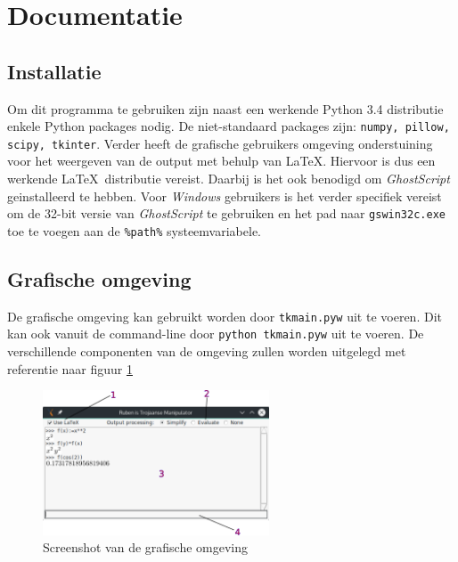 \documentclass[a4paper]{article}
\begin{document}
\section{Documentatie}
\subsection{Installatie}
Om dit programma te gebruiken zijn naast een werkende Python 3.4 distributie enkele Python packages nodig. De niet-standaard packages zijn: \texttt{numpy, pillow, scipy, tkinter}.
Verder heeft de grafische gebruikers omgeving onderstuining voor het weergeven van de output met behulp van \LaTeX. Hiervoor is dus een werkende \LaTeX~distributie vereist. Daarbij is het ook benodigd om \emph{GhostScript} geinstalleerd te hebben. Voor \emph{Windows} gebruikers is het verder specifiek vereist om de 32-bit versie van \emph{GhostScript} te gebruiken en het pad naar \texttt{gswin32c.exe} toe te voegen aan de \texttt{\%path\%} systeemvariabele.

\subsection{Grafische omgeving}
De grafische omgeving kan gebruikt worden door \texttt{tkmain.pyw} uit te voeren. Dit kan ook vanuit de command-line door \texttt{python tkmain.pyw} uit te voeren.  De verschillende componenten van de omgeving zullen worden uitgelegd met referentie naar figuur \ref{fig:screenshot}

\begin{figure}[!htb]
  \centering
  \includegraphics[width=0.6\textwidth]{screenshot.png}
  \caption{Screenshot van de grafische omgeving}
  \label{fig:screenshot}
\end{figure}
\end{document}
